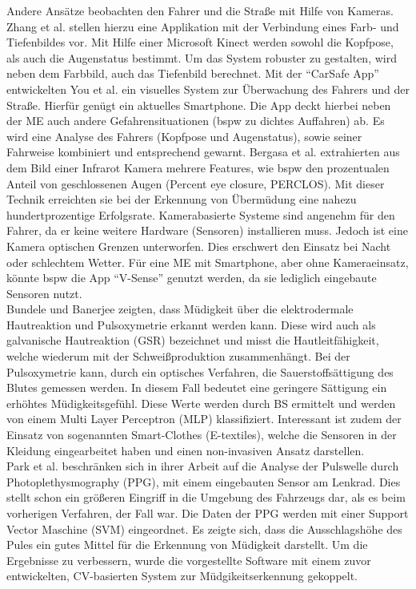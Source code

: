 {Andere Ansätze beobachten den Fahrer und die Straße mit Hilfe von Kameras. Zhang et al. \cite{Zhang:2015:RSD:2753829.2629482} stellen hierzu eine Applikation mit der Verbindung eines Farb- und Tiefenbildes vor. Mit Hilfe einer Microsoft Kinect werden sowohl die Kopfpose, als auch die Augenstatus bestimmt. Um das System robuster zu gestalten, wird neben dem Farbbild, auch das Tiefenbild berechnet. Mit der "`CarSafe App"' entwickelten You et al. \cite{You:2013:CAA:2462456.2465428} ein visuelles System zur Überwachung des Fahrers und der Straße. Hierfür genügt ein aktuelles Smartphone. Die App deckt hierbei neben der \acl{ME} auch andere Gefahrensituationen  (\acl{bspw} zu dichtes Auffahren) ab. Es wird eine Analyse des Fahrers (Kopfpose und Augenstatus), sowie seiner Fahrweise kombiniert und entsprechend gewarnt. Bergasa et al. \cite{Bergasa_1603553} extrahierten aus dem Bild einer Infrarot Kamera mehrere Features, wie \acl{bspw} den prozentualen Anteil von geschlossenen Augen (Percent eye closure, PERCLOS). Mit dieser Technik erreichten sie bei der Erkennung von Übermüdung eine nahezu hundertprozentige Erfolgsrate.
Kamerabasierte Systeme sind angenehm für den Fahrer, da er keine weitere Hardware (Sensoren) installieren muss. Jedoch ist eine Kamera optischen Grenzen unterworfen.  Dies erschwert den Einsatz bei Nacht oder schlechtem Wetter. Für eine \acl{ME} mit Smartphone, aber ohne Kameraeinsatz, könnte \acl{bspw} die App "`V-Sense"'  \cite{Chen:2015:ISV:2742647.2742659} genutzt werden, da sie lediglich  eingebaute Sensoren nutzt.\\

Bundele und Banerjee \citep{Bundele:2009:DFV:1806338.1806478} zeigten, dass Müdigkeit über die elektrodermale Hautreaktion und Pulsoxymetrie erkannt werden kann. Diese wird auch als galvanische Hautreaktion (GSR) bezeichnet und misst die Hautleitfähigkeit, welche wiederum mit der Schweißproduktion zusammenhängt. Bei der Pulsoxymetrie kann, durch ein optisches Verfahren, die Sauerstoffsättigung des Blutes gemessen werden. In diesem Fall bedeutet eine geringere Sättigung ein erhöhtes Müdigkeitsgefühl. Diese Werte werden durch \acl{BS} ermittelt und werden von einem Multi Layer Perceptron (MLP) klassifiziert. Interessant ist zudem der Einsatz von sogenannten Smart-Clothes (E-textiles), welche die Sensoren in der Kleidung eingearbeitet haben und einen non-invasiven Ansatz darstellen.\\

Park et al. \cite{Park:2009:DDD:1667780.1667798} beschränken sich in ihrer Arbeit auf die Analyse der Pulswelle durch Photoplethysmography (PPG), mit einem eingebauten Sensor am Lenkrad. Dies stellt schon ein größeren Eingriff in die Umgebung des Fahrzeugs dar, als es beim vorherigen Verfahren, der Fall war. Die Daten der PPG werden mit einer Support Vector Maschine (SVM) eingeordnet. Es zeigte sich, dass die Ausschlagshöhe des Pules ein gutes Mittel für die Erkennung von Müdigkeit darstellt. Um die Ergebnisse zu verbessern, wurde die vorgestellte Software mit einem zuvor entwickelten, CV-basierten System zur Müdgikeitserkennung gekoppelt. \\

}
